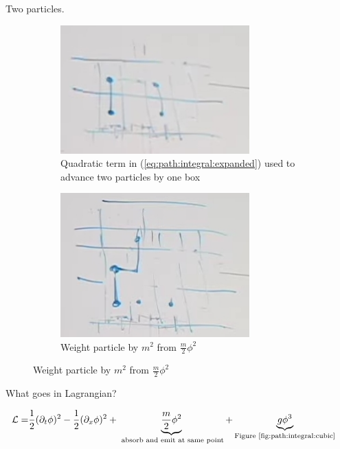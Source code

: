 \documentclass[]{article}
\begin{document}
Two particles.

\begin{figure}[H]
	\caption{Two particles}\label{fig:path:integral:2particles:1}
	\begin{subfigure}{0.45\textwidth}
		\caption{Quadratic term in (\ref{eq:path:integral:expanded}) used to advance two particles by one box}
		\includegraphics[width=0.8\textwidth]{path-integral-2particles-1}
	\end{subfigure}
	\begin{subfigure}{0.45\textwidth}
		\caption{Weight particle by $m^2$ from $\frac{m}{2}\phi^2$}\label{fig:path:integral:mass}
		\includegraphics[width=0.8\textwidth]{path-integral-mass}
	\end{subfigure}
\end{figure}

What goes in Lagrangian?

\begin{align*}
\mathcal{L}=& \frac{1}{2} (\partial_t \phi)^2 - \frac{1}{2} (\partial_x \phi)^2 + \underbrace{\frac{m}{2}\phi^2}_\text{ absorb and emit at same point} +\underbrace{g \phi^3}_\text{Figure \ref{fig:path:integral:cubic}}
\end{align*}
\end{document}
